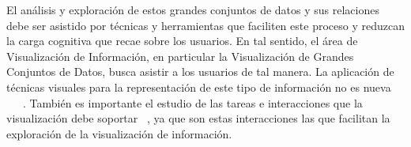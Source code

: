 El análisis y exploración de estos grandes conjuntos de datos y sus relaciones debe ser asistido por técnicas y herramientas que faciliten este proceso y reduzcan la carga cognitiva que recae sobre los usuarios. En tal sentido, el área de Visualización de Información, en particular la Visualización de Grandes Conjuntos de Datos, busca asistir a los usuarios de tal manera. La aplicación de técnicas visuales para la representación de este tipo de información no es nueva ~\cite{ref_article26}~\cite{ref_article27}~\cite{ref_article28}. También es importante el estudio de las tareas e interacciones que la visualización debe soportar ~\cite{ref_article29}, ya que son estas interacciones las que facilitan la exploración de la visualización de información.

